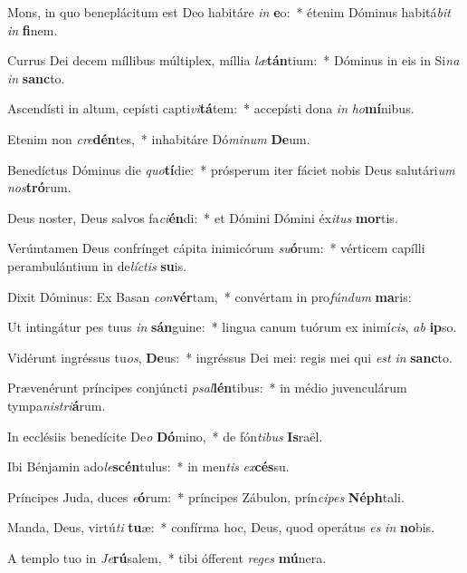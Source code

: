 \item Mons, in quo beneplácitum est Deo habitáre \textit{in} \textbf{e}o:~* étenim Dóminus habitá\textit{bit} \textit{in} \textbf{fi}nem.
\item Currus Dei decem míllibus múltiplex, míllia \textit{læ}\textbf{tán}tium:~* Dóminus in eis in Si\textit{na} \textit{in} \textbf{sanc}to.
\item Ascendísti in altum, cepísti capti\textit{vi}\textbf{tá}tem:~* accepísti dona \textit{in} \textit{ho}\textbf{mí}nibus.
\item Etenim non \textit{cre}\textbf{dén}tes,~* inhabitáre Dó\textit{mi}\textit{num} \textbf{De}um.
\item Benedíctus Dóminus die \textit{quo}\textbf{tí}die:~* prósperum iter fáciet nobis Deus salutári\textit{um} \textit{nos}\textbf{tró}rum.
\item Deus noster, Deus salvos fa\textit{ci}\textbf{én}di:~* et Dómini Dómini éx\textit{i}\textit{tus} \textbf{mor}tis.
\item Verúmtamen Deus confrínget cápita inimicórum \textit{su}\textbf{ó}rum:~* vérticem capílli perambulántium in de\textit{líc}\textit{tis} \textbf{su}is.
\item Dixit Dóminus: Ex Basan \textit{con}\textbf{vér}tam,~* convértam in pro\textit{fún}\textit{dum} \textbf{ma}ris:
\item Ut intingátur pes tuus \textit{in} \textbf{sán}guine:~* lingua canum tuórum ex inimí\textit{cis}, \textit{ab} \textbf{ip}so.
\item Vidérunt ingréssus tu\textit{os}, \textbf{De}us:~* ingréssus Dei mei: regis mei qui \textit{est} \textit{in} \textbf{sanc}to.
\item Prævenérunt príncipes conjúncti \textit{psal}\textbf{lén}tibus:~* in médio juvenculárum tympa\textit{nis}\textit{tri}\textbf{á}rum.
\item In ecclésiis benedícite De\textit{o} \textbf{Dó}mino,~* de fón\textit{ti}\textit{bus} \textbf{Is}raël.
\item Ibi Bénjamin ado\textit{le}\textbf{scén}tulus:~* in men\textit{tis} \textit{ex}\textbf{cés}su.
\item Príncipes Juda, duces \textit{e}\textbf{ó}rum:~* príncipes Zábulon, prín\textit{ci}\textit{pes} \textbf{Néph}tali.
\item Manda, Deus, virtú\textit{ti} \textbf{tu}æ:~* confírma hoc, Deus, quod operátus \textit{es} \textit{in} \textbf{no}bis.
\item A templo tuo in \textit{Je}\textbf{rú}salem,~* tibi ófferent \textit{re}\textit{ges} \textbf{mú}nera.
